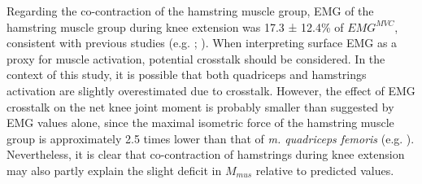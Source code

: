 \documentclass[
  11pt,
  a4paper]{article}
\begin{document}
Regarding the co-contraction of the hamstring muscle group, EMG of the
hamstring muscle group during knee extension was 17.3 ± 12.4\% of
\(EMG^{MVC}\), consistent with previous studies (e.g.
;
). When
interpreting surface EMG as a proxy for muscle activation, potential
crosstalk should be considered. In the context of this study, it is
possible that both quadriceps and hamstrings activation are slightly
overestimated due to crosstalk. However, the effect of EMG crosstalk on
the net knee joint moment is probably smaller than suggested by EMG
values alone, since the maximal isometric force of the hamstring muscle
group is approximately 2.5 times lower than that of \emph{m. quadriceps
femoris} (e.g. ). Nevertheless, it is clear that co-contraction of hamstrings
during knee extension may also partly explain the slight deficit in
\(M_{mus}\) relative to predicted values.
\end{document}
